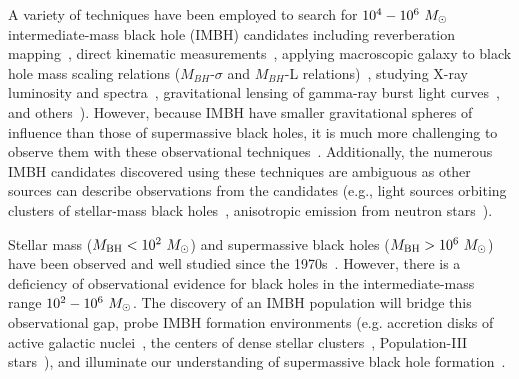 \documentclass[
 nofootinbib,
 amsmath,amssymb,
 aps,
 twocolumn,
 superscriptaddress
]{revtex4-2}
\newcommand{\mathcmd}[1]{{\sc \relax\ifmmode#1\else $#1$\fi}\xspace}
\newcommand{\msun}{\mathcmd{M_\odot}}
\begin{document}
A variety of techniques have been employed to search for $10^{4} - 10^{6}~\msun$ intermediate-mass black hole (IMBH) candidates including reverberation mapping~\cite{Peterson:2014:SSRv}, direct kinematic measurements~\cite{Schodel:2002:Natur, Kiziltan:2017:Natur}, applying macroscopic galaxy to black hole mass scaling relations ($M_{BH}$-$\sigma$ and $M_{BH}$-L relations)~\cite{Graham:2013:ApJ, Wevers:2017:MNRAS}, studying  X-ray luminosity and spectra~\cite{Greene:2004:ApJ, Lin:2020:ApJL}, gravitational lensing of gamma-ray burst light curves~\cite{paynter_evidence_2021}, and others~\cite{Greene:2020:ARA&A, Koliopanos:2017:mbhe, Mezcua:2017:IJMPD}). However, because IMBH have smaller gravitational spheres of influence than those of supermassive black holes, it is much more challenging to observe them with these observational techniques~\cite{Mezcua:2017:IJMPD}. Additionally, the numerous IMBH candidates discovered using these techniques are ambiguous as other sources can describe observations from the candidates (e.g., light sources orbiting clusters of stellar-mass black holes~\cite{Ridolfi:2016:MNRAS, Freire:2017:MNRAS}, anisotropic emission from neutron stars~\cite{Israel:2017:MNRAS, RodriguezCastillo:2020:ApJ}).

Stellar mass ($M_\text{BH} < 10^{2}~\msun$) and supermassive black holes ($M_\text{BH} > 10^{6}~\msun$) have been observed and well studied since the 1970s~\cite{Webster:1972:Natur, Balick:1974:ApJ, Ghez:1998:ApJ, Genzel:2010:RvMP, Abbott:2019:PhRvX, EventHorizonTelescopeCollaboration:2019:ApJL, Abbott:2020:arXiv}. However, there is a deficiency of observational evidence for black holes in the intermediate-mass range $10^{2} - 10^{6}~\msun$. The discovery of an IMBH population will bridge this observational gap, probe IMBH formation environments (e.g. accretion disks of active galactic nuclei~\cite{Tagawa:2021:ApJ, Li:2021:arXiv, Samsing:2020:arXiv, Tagawa:2020:ApJ, Ishibashi:2020:A&A, Grobner:2020:A&A, Yang:2019:PhRvL, McKernan:2019:ApJL, Yang:2019:ApJ, McKernan:2018:ApJ, Bellovary:2016:ApJL, McKernan:2014:MNRAS, McKernan:2012:MNRAS}, the centers of dense stellar clusters~\cite{Banerjee:2021:MNRASa, Zevin:2021:ApJ,Mapelli:2021:arXiv,Weatherford:2021:ApJL, Bouffanais:2021:arXiv, Ballone:2021:MNRAS, Kumamoto:2021:arXiv, Banerjee:2021:MNRASb, Martinez:2020:ApJ, Romero-Shaw:2020:ApJL, Anagnostou:2020:PASA}, Population-III stars~\cite{Toubiana:2021:PhRvL, Farrell:2021:MNRAS, Safarzadeh:2020:ApJL, Liu:2020:MNRAS, Inayoshi:2017:MNRAS}), and illuminate our understanding of supermassive black hole formation~\cite{Askar:2021:MNRAS, ArcaSedda:2019:arXiv, Amaro-Seoane:2007:CQGra, Gurkan:2006:ApJL}. 
\end{document}
